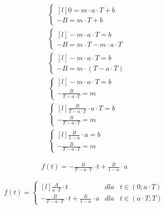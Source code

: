 \begin{task}
\begin{align*}
&\left\{\begin{matrix*}[l]
0 = m\cdot a \cdot T +b\\ 
-B = m\cdot T +b
\end{matrix*}\right. \\
&\left\{\begin{matrix*}[l]
-m \cdot a \cdot T = b\\ 
-B = m \cdot T -m \cdot a \cdot T
\end{matrix*}\right. \\
&\left\{\begin{matrix*}[l]
-m \cdot a \cdot T = b\\ 
-B = m \cdot \left( T - a \cdot T\right)
\end{matrix*}\right. \\
&\left\{\begin{matrix*}[l]
-m \cdot a \cdot T = b\\ 
-\frac{B}{T - a \cdot T} = m
\end{matrix*}\right. \\
&\left\{\begin{matrix*}[l]
\frac{B}{T - a \cdot T} \cdot a \cdot T = b\\ 
-\frac{B}{T - a \cdot T} = m
\end{matrix*}\right. \\
&\left\{\begin{matrix*}[l]
\frac{B}{1 - a} \cdot a = b\\ 
-\frac{B}{T - a \cdot T} = m
\end{matrix*}\right.
\end{align*}


\begin{align*}
f(t) = -\frac{B}{T - a \cdot T}\cdot t + \frac{B}{1 - a} \cdot a
\end{align*}


\begin{align*}
f(t) = \left\{\begin{matrix*}[l]
\frac{A}{a \cdot T}\cdot t & dla &t \in (0; a \cdot T)\\ 
-\frac{B}{T - a \cdot T}\cdot t + \frac{B}{1 - a} \cdot a & dla & t \in (a \cdot T; T)
\end{matrix*}\right.
\end{align*}


\end{task}
